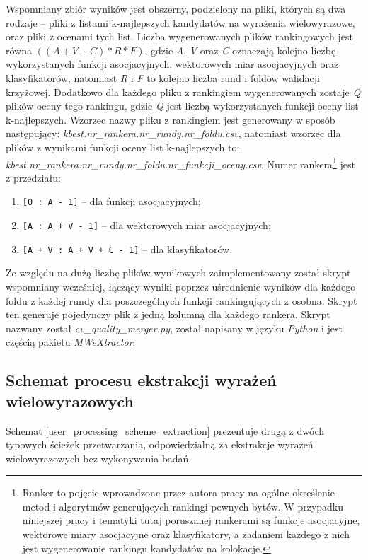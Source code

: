 \par
Wspomniany zbiór wyników jest obszerny, podzielony na pliki, których są dwa rodzaje -- pliki z listami k-najlepszych kandydatów na wyrażenia wielowyrazowe, oraz pliki z ocenami tych list.
Liczba wygenerowanych plików rankingowych jest równa \( ((A + V + C) * R * F) \), gdzie \emph{A}, \emph{V} oraz \emph{C} oznaczają kolejno liczbę wykorzystanych funkcji asocjacyjnych, wektorowych miar asocjacyjnych oraz klasyfikatorów, natomiast \emph{R} i \emph{F} to kolejno liczba rund i foldów walidacji krzyżowej.
Dodatkowo dla każdego pliku z rankingiem wygenerowanych zostaje \emph{Q} plików oceny tego rankingu, gdzie \emph{Q} jest liczbą wykorzystanych funkcji oceny list k-najlepszych.
Wzorzec nazwy pliku z rankingiem jest generowany w sposób następujący: \emph{kbest.nr\_rankera.nr\_rundy.nr\_foldu.csv}, natomiast wzorzec dla plików z wynikami funkcji oceny list k-najlepszych to: \emph{kbest.nr\_rankera.nr\_rundy.nr\_foldu.nr\_funkcji\_oceny.csv}.
Numer rankera\footnote{Ranker to pojęcie wprowadzone przez autora pracy na ogólne określenie metod i algorytmów generujących rankingi pewnych bytów. W przypadku niniejszej pracy i tematyki tutaj poruszanej rankerami są funkcje asocjacyjne, wektorowe miary asocjacyjne oraz klasyfikatory, a zadaniem każdego z nich jest wygenerowanie rankingu kandydatów na kolokacje.} jest z przedziału:
\begin{enumerate}
  \item \texttt{[0     : A         - 1]} -- dla funkcji asocjacyjnych;
  \item \texttt{[A     : A + V     - 1]} -- dla wektorowych miar asocjacyjnych;
  \item \texttt{[A + V : A + V + C - 1]} -- dla klasyfikatorów.
\end{enumerate}

Ze względu na dużą liczbę plików wynikowych zaimplementowany został skrypt wspomniany wcześniej, łączący wyniki poprzez uśrednienie wyników dla każdego foldu z każdej rundy dla poszczególnych funkcji rankingujących z osobna.
Skrypt ten generuje pojedynczy plik z jedną kolumną dla każdego rankera.
Skrypt nazwany został \emph{cv\_quality\_merger.py}, został napisany w języku \emph{Python} i jest częścią pakietu \emph{MWeXtractor}.


\subsection{Schemat procesu ekstrakcji wyrażeń wielowyrazowych}
Schemat \ref{user_processing_scheme_extraction} prezentuje drugą z dwóch typowych ścieżek przetwarzania, odpowiedzialną za ekstrakcje wyrażeń wielowyrazowych bez wykonywania badań.

